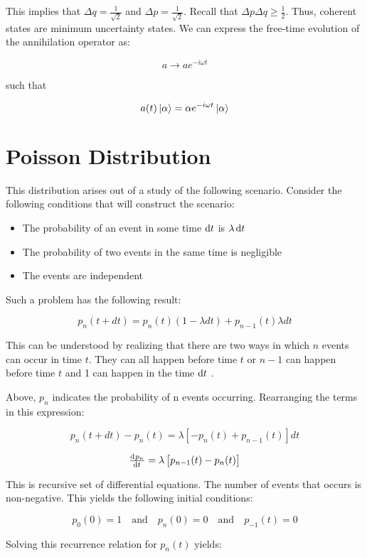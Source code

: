 \documentclass{article}
\begin{document}
This implies that $ \Delta q = \frac{1}{\sqrt{2}} $ and $ \Delta p =
\frac{1}{\sqrt{2}} $. Recall that $ \Delta p \Delta q \ge \frac{1}{2} $. Thus,
coherent states are minimum uncertainty states. We can express the free-time
evolution of the annihilation operator as:

\[
a \rightarrow a e^{-i \omega t}  
\]

such that

\[
   a(t) \Ket{\alpha} = \alpha e^{-i \omega t} \Ket{\alpha} 
\]

\section{Poisson Distribution}

This distribution arises out of a study of the following scenario. Consider the
following conditions that will construct the scenario:

\begin{itemize}
   \item The probability of an event in some time $ \dif t$ is $\lambda \dif t$
   \item The probability of two events in the same time is negligible
   \item The events are independent
\end{itemize}

Such a problem has the following result:

\[
   p_n (t+dt) = p_n(t) \left( 1 - \lambda dt \right) + p_{n-1}(t) \lambda dt
\]

This can be understood by realizing that there are two ways in which $n$ events
can occur in time $ t $. They can all happen before time $ t $ or $ n-1 $ can happen
before time $ t $ and 1 can happen in the time $ \dif t $ . 

Above, $ p_n $ indicates the probability of n events occurring. Rearranging the
terms in this expression:

\[
   p_n(t+dt) - p_n(t) = \lambda \left[ - p_n(t) + p_{n-1}(t) \right] dt
\]

\[
   \od{p_n}{t} = \lambda \left[ p_{n-1}(t) - p_n(t) \right]
\]

This is recursive set of differential equations. The number of events that
occurs is non-negative. This yields the following initial conditions:

\[
   p_0(0) = 1 \quad \text{and} \quad p_n(0) = 0 \quad \text{and} \quad p_{-1}(t) = 0
\]

Solving this recurrence relation for $ p_n(t) $ yields:
\end{document}
